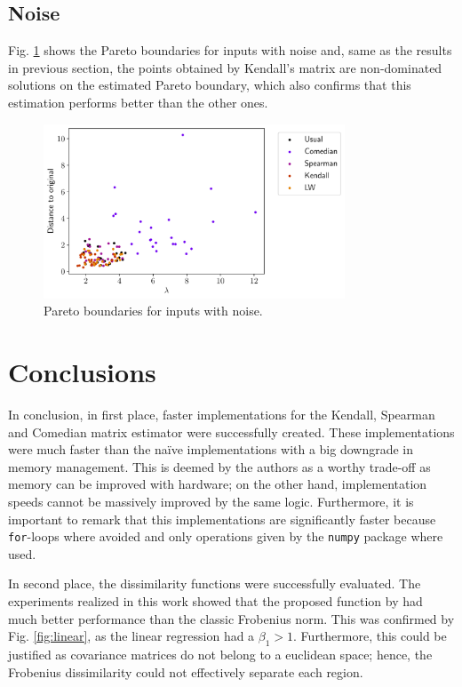 \documentclass[11pt]{article}
\theoremstyle{definition}
\theoremstyle{remark}
\theoremstyle{remark}
\theoremstyle{remark}
\begin{document}
\subsection{Noise}
Fig. \ref{fig:paretonoise} shows the Pareto boundaries for inputs with noise
and, same as the results in previous section, the points obtained by Kendall's
matrix are non-dominated solutions on the estimated Pareto boundary, which also
confirms that this estimation performs better than the other ones.

\begin{figure}
  \centering \includegraphics[width=0.8\textwidth]{figs/noise-scatter.pdf}
  \caption{Pareto boundaries for inputs with noise.}
  \label{fig:paretonoise}
\end{figure}

\section{Conclusions}\label{sec:conc}

In conclusion, in first place, faster implementations for the Kendall, Spearman
and Comedian matrix estimator were successfully created. These implementations
were much faster than the naïve implementations with a big downgrade in memory
management. This is deemed by the authors as a worthy trade-off as memory can be
improved with hardware; on the other hand, implementation speeds cannot be
massively improved by the same logic. Furthermore, it is important to remark
that this implementations are significantly faster because \texttt{for}-loops
where avoided and only operations given by the \texttt{numpy} package where
used.

In second place, the dissimilarity functions were successfully evaluated. The
experiments realized in this work showed that the proposed function by
\textcite{tuzel2006} had much better performance than the classic Frobenius
norm. This was confirmed by Fig. \ref{fig:linear}, as the linear regression had
a $\beta_1 > 1$. Furthermore, this could be justified as covariance matrices do
not belong to a euclidean space; hence, the Frobenius dissimilarity could not
effectively separate each region.
\end{document}

